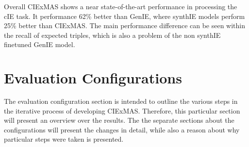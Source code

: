 \documentclass[a4paper,oneside,bibliography=totoc]{scrbook}
\begin{document}
Overall CIExMAS shows a near state-of-the-art performance in processing the \ac{cIE} task. It performance 62\% better than GenIE, where synthIE models perform 25\% better than CIExMAS. The main performance difference can be seen within the recall of expected triples, which is also a problem of the non synthIE finetuned GenIE model.

\section{Evaluation Configurations}
\label{sec:evaluation_configurations}

The evaluation configuration section is intended to outline the various steps in the iterative process of developing CIExMAS. Therefore, this particular section will present an overview over the results. The the separate sections about the configurations will present the changes in detail, while also a reason about why particular steps were taken is presented.
\end{document}
